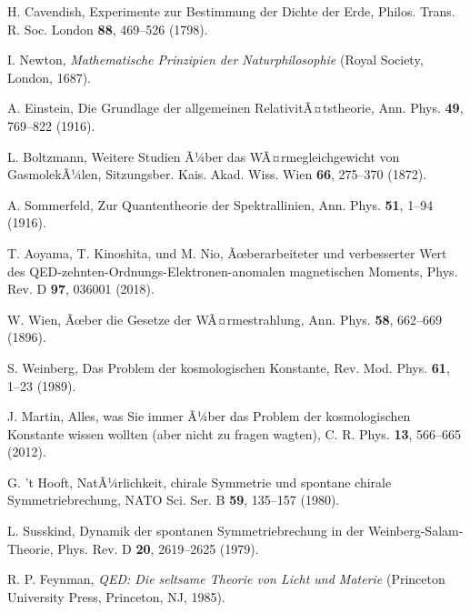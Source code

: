 ﻿\documentclass[twocolumn,aps,prl]{revtex4-2}
\begin{document}
{{{{{{{{{{{{{{{{\begin{thebibliography}{99}
																				 H. Cavendish, Experimente zur Bestimmung der Dichte der Erde, Philos. Trans. R. Soc. London \textbf{88}, 469--526 (1798).
																				
																				 I. Newton, \textit{Mathematische Prinzipien der Naturphilosophie} (Royal Society, London, 1687).
																				
																				 A. Einstein, Die Grundlage der allgemeinen RelativitÃ¤tstheorie, Ann. Phys. \textbf{49}, 769--822 (1916).
																				
																				 L. Boltzmann, Weitere Studien Ã¼ber das WÃ¤rmegleichgewicht von GasmolekÃ¼len, Sitzungsber. Kais. Akad. Wiss. Wien \textbf{66}, 275--370 (1872).
																				
																				 A. Sommerfeld, Zur Quantentheorie der Spektrallinien, Ann. Phys. \textbf{51}, 1--94 (1916).
																				
																				 T. Aoyama, T. Kinoshita, und M. Nio, Ãœberarbeiteter und verbesserter Wert des QED-zehnten-Ordnungs-Elektronen-anomalen magnetischen Moments, Phys. Rev. D \textbf{97}, 036001 (2018).
																				
																				 W. Wien, Ãœber die Gesetze der WÃ¤rmestrahlung, Ann. Phys. \textbf{58}, 662--669 (1896).
																				
																				 S. Weinberg, Das Problem der kosmologischen Konstante, Rev. Mod. Phys. \textbf{61}, 1--23 (1989).
																				
																				 J. Martin, Alles, was Sie immer Ã¼ber das Problem der kosmologischen Konstante wissen wollten (aber nicht zu fragen wagten), C. R. Phys. \textbf{13}, 566--665 (2012).
																				
																				 G. 't Hooft, NatÃ¼rlichkeit, chirale Symmetrie und spontane chirale Symmetriebrechung, NATO Sci. Ser. B \textbf{59}, 135--157 (1980).
																				
																				 L. Susskind, Dynamik der spontanen Symmetriebrechung in der Weinberg-Salam-Theorie, Phys. Rev. D \textbf{20}, 2619--2625 (1979).
																				
																				 R. P. Feynman, \textit{QED: Die seltsame Theorie von Licht und Materie} (Princeton University Press, Princeton, NJ, 1985).
																				

\end{thebibliography}}}}}}}}}}}}}}}}}
\end{document}
